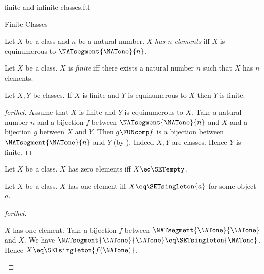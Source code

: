\documentclass{naproche-library}
\begin{document}
\begin{smodule}[title=Finite and Infinite Classes]{finite-and-infinite-classes.ftl}

\begin{sfragment}{Finite Classes}

  \begin{definition}[forthel,id=FOUNDATIONS_14_3512046897512410]
    Let $X$ be a class and $n$ be a natural number.
    $X$ \emph{has $n$ elements} iff $X$ is equinumerous to $\NATsegment{\NATone}{n}$.
  \end{definition}

  \begin{definition}[forthel,id=FOUNDATIONS_14_3694156977274880]
    Let $X$ be a class.
    $X$ is \emph{finite} iff there exists a natural number $n$ such that $X$ has $n$ elements.
  \end{definition}

  \begin{proposition}[forthel,id=FOUNDATIONS_14_3929085203972096]
    Let $X, Y$ be classes.
    If $X$ is finite and $Y$ is equinumerous to $X$ then $Y$ is finite.
  \end{proposition}
  \begin{proof}[forthel]
    Assume that $X$ is finite and $Y$ is equinumerous to $X$.
    Take a natural number $n$ and a bijection $f$ between $\NATsegment{\NATone}{n}$ and $X$ and a bijection $g$ between $X$ and $Y$.
    Then $g \FUNcomp f$ is a bijection between $\NATsegment{\NATone}{n}$ and $Y$ (by ).
    Indeed $X, Y$ are classes.
    Hence $Y$ is finite.
  \end{proof}

  \begin{proposition}[forthel,id=FOUNDATIONS_14_5132547854597502]
    Let $X$ be a class.
    $X$ has zero elements iff $X \eq \SETempty$.
  \end{proposition}

  \begin{proposition}[forthel,id=FOUNDATIONS_14_6812054297034125]
    Let $X$ be a class.
    $X$ has one element iff $X \eq \SETsingleton{a}$ for some object $a$.
  \end{proposition}
  \begin{proof}[forthel]
    \begin{case}{$X$ has one element.}
      Take a bijection $f$ between $\NATsegment{\NATone}{\NATone}$ and $X$.
      We have $\NATsegment{\NATone}{\NATone} \eq \SETsingleton{\NATone}$.
      Hence $X \eq \SETsingleton{f(\NATone)}$.
    \end{case}


\end{proof}
\end{sfragment}
\end{smodule}
\end{document}
